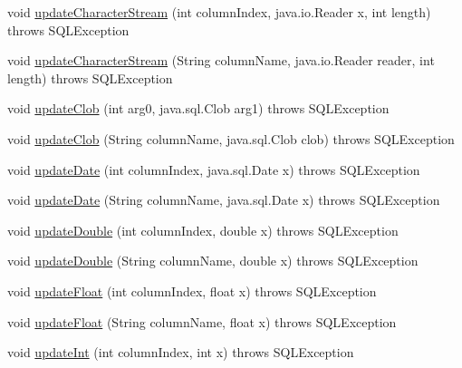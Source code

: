 \begin{DoxyCompactItemize}
\item 
void \mbox{\hyperlink{classcom_1_1mysql_1_1jdbc_1_1_result_set_impl_a06e47500f516d306c2329d032eb13353}{update\+Character\+Stream}} (int column\+Index, java.\+io.\+Reader x, int length)  throws S\+Q\+L\+Exception 
\item 
void \mbox{\hyperlink{classcom_1_1mysql_1_1jdbc_1_1_result_set_impl_a52e971e70d6997c0f741932f91e6c1d4}{update\+Character\+Stream}} (String column\+Name, java.\+io.\+Reader reader, int length)  throws S\+Q\+L\+Exception 
\item 
void \mbox{\hyperlink{classcom_1_1mysql_1_1jdbc_1_1_result_set_impl_a30158cf109fab3d9e3842ac81fae489d}{update\+Clob}} (int arg0, java.\+sql.\+Clob arg1)  throws S\+Q\+L\+Exception 
\item 
void \mbox{\hyperlink{classcom_1_1mysql_1_1jdbc_1_1_result_set_impl_a9b169ffea6210a494fc74ead38e60d17}{update\+Clob}} (String column\+Name, java.\+sql.\+Clob clob)  throws S\+Q\+L\+Exception 
\item 
void \mbox{\hyperlink{classcom_1_1mysql_1_1jdbc_1_1_result_set_impl_a4411849c1033b786838cd008e7ecd76e}{update\+Date}} (int column\+Index, java.\+sql.\+Date x)  throws S\+Q\+L\+Exception 
\item 
void \mbox{\hyperlink{classcom_1_1mysql_1_1jdbc_1_1_result_set_impl_a39ed44af35f25e15d4d5657663301cfb}{update\+Date}} (String column\+Name, java.\+sql.\+Date x)  throws S\+Q\+L\+Exception 
\item 
void \mbox{\hyperlink{classcom_1_1mysql_1_1jdbc_1_1_result_set_impl_a96ad2b9447082dceb1828acb8377645e}{update\+Double}} (int column\+Index, double x)  throws S\+Q\+L\+Exception 
\item 
void \mbox{\hyperlink{classcom_1_1mysql_1_1jdbc_1_1_result_set_impl_aadcc20dabbb79344eed654cbdccf42d2}{update\+Double}} (String column\+Name, double x)  throws S\+Q\+L\+Exception 
\item 
void \mbox{\hyperlink{classcom_1_1mysql_1_1jdbc_1_1_result_set_impl_a4f0a2514b5e2218b899cf71697f57b0f}{update\+Float}} (int column\+Index, float x)  throws S\+Q\+L\+Exception 
\item 
void \mbox{\hyperlink{classcom_1_1mysql_1_1jdbc_1_1_result_set_impl_a075591244c917aa7694d8f5d6cfa8025}{update\+Float}} (String column\+Name, float x)  throws S\+Q\+L\+Exception 
\item 
void \mbox{\hyperlink{classcom_1_1mysql_1_1jdbc_1_1_result_set_impl_ad21e446740a13919c3728733d0bf1f10}{update\+Int}} (int column\+Index, int x)  throws S\+Q\+L\+Exception 
\item 

\end{DoxyCompactItemize}
